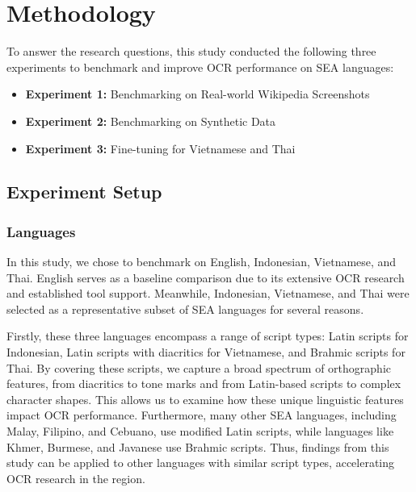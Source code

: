 \documentclass[12pt,oneside]{memoir}
\begin{document}
\chapter{Methodology}

To answer the research questions, this study conducted the following three experiments to benchmark and improve OCR performance on SEA languages:

\begin{itemize}
    \item \textbf{Experiment 1:} Benchmarking on Real-world Wikipedia Screenshots
    \item \textbf{Experiment 2:} Benchmarking on Synthetic Data
    \item \textbf{Experiment 3:} Fine-tuning for Vietnamese and Thai
\end{itemize}

\section{Experiment Setup}

\subsection{Languages}

In this study, we chose to benchmark on English, Indonesian, Vietnamese, and Thai. English serves as a baseline comparison due to its extensive OCR research and established tool support. Meanwhile, Indonesian, Vietnamese, and Thai were selected as a representative subset of SEA languages for several reasons.

Firstly, these three languages encompass a range of script types: Latin scripts for Indonesian, Latin scripts with diacritics for Vietnamese, and Brahmic scripts for Thai. 
By covering these scripts, we capture a broad spectrum of orthographic features, from diacritics to tone marks and from Latin-based scripts to complex character shapes. This allows us to examine how these unique linguistic features impact OCR performance. 
Furthermore, many other SEA languages, including Malay, Filipino, and Cebuano, use modified Latin scripts, while languages like Khmer, Burmese, and Javanese use Brahmic scripts. Thus, findings from this study can be applied to other languages with similar script types, accelerating OCR research in the region.
\end{document}
